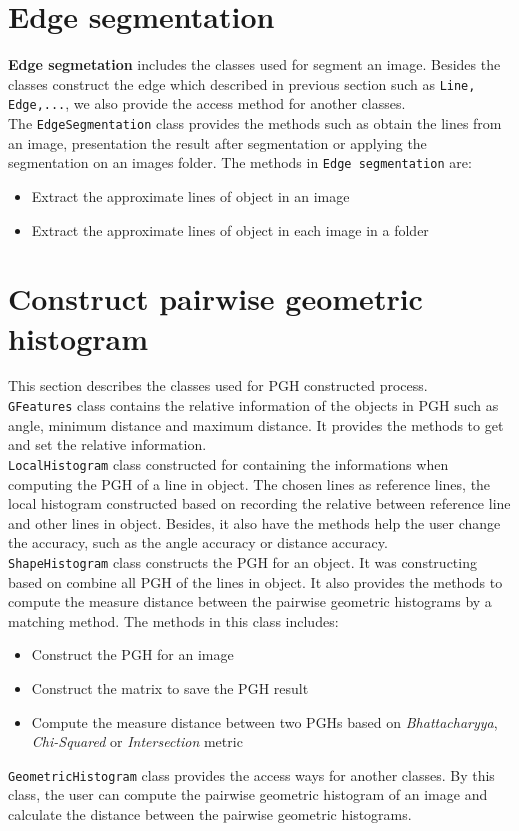 \section{Edge segmentation }
\textbf{Edge segmetation} includes the classes used for segment an image. Besides the classes construct the edge which described in previous section such as \texttt{Line, Edge,...}, we also provide the access method for another classes.\\[0.2cm]
The \texttt{EdgeSegmentation} class provides the methods such as obtain the lines from an image, presentation the result after segmentation or applying the segmentation on an images folder. The methods in \texttt{Edge segmentation} are:
\begin{itemize}
\item Extract the approximate lines of object in an image
\item Extract the approximate lines of object in each image in a folder
\end{itemize}
\section{Construct pairwise geometric histogram}
This section describes the classes used for PGH constructed process.\\[0.2cm]
\texttt{GFeatures} class contains the relative information of the objects in PGH such as angle, minimum distance and maximum distance. It provides the methods to get and set the relative information.\\[0.2cm]
\texttt{LocalHistogram} class constructed for containing the informations when computing the PGH of a line in object. The chosen lines as reference lines, the local histogram constructed based on recording the relative between reference line and other lines in object. Besides, it also have the methods help the user change the accuracy, such as the angle accuracy or distance accuracy.\\[0.2cm]
\texttt{ShapeHistogram} class constructs the PGH for an object. It was constructing based on combine all PGH of the lines in object. It also provides the methods to compute the measure distance between the pairwise geometric histograms by a matching method. The methods in this class includes:
\begin{itemize}
\item Construct the PGH for an image
\item Construct the matrix to save the PGH result
\item Compute the measure distance between two PGHs based on \textit{Bhattacharyya}, \textit{Chi-Squared} or \textit{Intersection} metric
\end{itemize}
\texttt{GeometricHistogram} class provides the access ways for another classes. By this class, the user can compute the pairwise geometric histogram of an image and calculate the distance between the pairwise geometric histograms.

